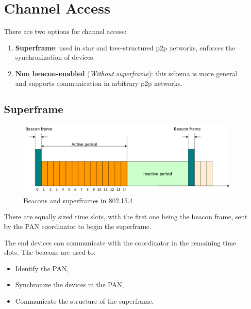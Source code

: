 \section{Channel Access}
There are two options for channel access:
\begin{enumerate}
   \item \textbf{Superframe}:
   used in star and tree-structured p2p networks, enforces the synchronization of devices.
   \item \textbf{Non beacon-enabled} (\textit{Without superframe}):
   this schema is more general and supports communication in arbitrary p2p networks.
\end{enumerate}

\subsection{Superframe}
\begin{figure}[htbp]
   \centering
   \includegraphics{images/802_superframe_beacon.png}
   \caption{Beacons and superframes in 802.15.4}
   \label{fig:802_superframe_beacon}
\end{figure}

There are equally sized time slots, with the first one being the beacon frame, sent by the PAN coordinator to begin the superframe.

The end devices can communicate with the coordinator in the
remaining time slots.
The beacons are used to:
\begin{itemize}
   \item Identify the PAN,
   \item Synchronize the devices in the PAN,
   \item Communicate the structure of the superframe.
\end{itemize}

